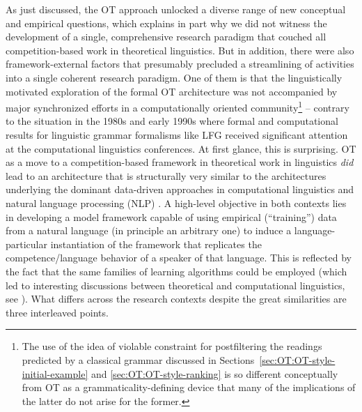 \documentclass[output=paper,hidelinks]{langscibook}
\begin{document}
As just discussed, the OT approach unlocked a diverse range of new conceptual and empirical questions, which explains in part why we did not witness the development of a single, comprehensive research paradigm that couched all competition-based work in theoretical linguistics. But in addition, there were also framework-external factors that presumably precluded a streamlining of activities into a single coherent research paradigm.  One of them is that the linguistically motivated exploration of the formal OT architecture was not accompanied by major synchronized efforts in a computationally oriented community\footnote{The use of the idea of violable constraint for postfiltering the readings predicted by a classical grammar discussed in Sections~\ref{sec:OT:OT-style-initial-example} and \ref{sec:OT:OT-style-ranking} is so different conceptually from OT as a grammaticality-defining device that many of the implications of the latter do not arise for the former.} --  contrary to the situation in the 1980s and early 1990s where formal and computational results for linguistic grammar formalisms like LFG received significant attention at the computational linguistics conferences. %
At first glance, this is surprising.
OT as a move to a competition-based framework in theoretical work in linguistics \emph{did} lead to an architecture that is structurally very similar to the architectures underlying the dominant data-driven approaches in computational linguistics and natural language processing (NLP) \citep[287]{eisner-2000-book}. %
A high-level objective in both contexts lies in developing a model framework capable of using empirical (``training'') data from a natural language (in principle an arbitrary one) to induce a language-particular instantiation of the framework that replicates the competence/language behavior of a speaker of that language. This is reflected by the fact that the same families of learning algorithms could be employed (which led to interesting discussions between theoretical and computational linguistics, see \citealt{KellerAsudeh02,GoldwaterJohnson2003,Jaeger07}).
What differs across the research contexts despite the great similarities are three interleaved %
points.
\end{document}
